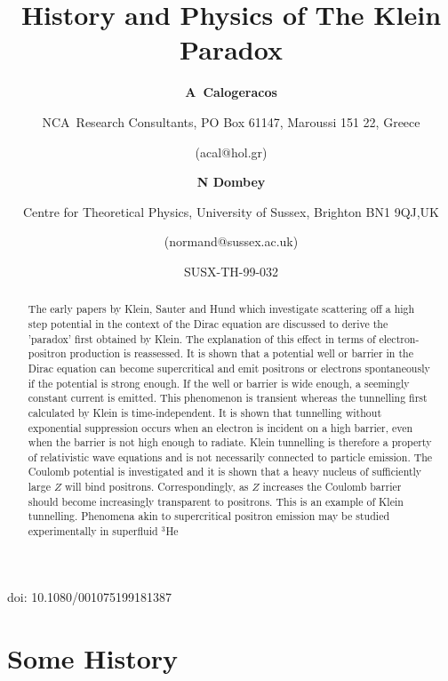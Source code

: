 doi: 10.1080/001075199181387



\title{{\bf History and Physics of The Klein Paradox}}
\author{{\bf A\ Calogeracos}}
\author{NCA\ Research Consultants, PO Box 61147, Maroussi 151 22, Greece}
\author{(acal@hol.gr)}
\author{{\bf N Dombey}}
\author{Centre for Theoretical Physics, University of Sussex, Brighton BN1 9QJ,UK}
\author{(normand@sussex.ac.uk)}
\date{SUSX-TH-99-032}
\maketitle

\begin{abstract}
\newline
\noindent The early papers by Klein, Sauter and Hund which investigate
scattering off a high step potential in the context of the Dirac equation
are discussed to derive the 'paradox' first obtained by Klein. The
explanation of this effect in terms of electron-positron production is
reassessed. It is shown that a potential well or barrier in the Dirac
equation can become supercritical and emit  positrons or electrons 
spontaneously if the potential is strong enough. If the well or barrier 
is wide enough, a seemingly constant current is emitted. This 
phenomenon is transient whereas the tunnelling first calculated 
by Klein is time-independent. It is shown that tunnelling without 
exponential suppression occurs when an electron is incident on a 
high barrier, even when the barrier is not high enough to radiate. 
Klein tunnelling is therefore a property of relativistic wave 
equations and is not necessarily connected to particle emission. The 
Coulomb potential is investigated and it is shown that a heavy nucleus of
sufficiently large $Z$ will bind positrons. Correspondingly, 
as $Z$ increases the Coulomb barrier should become increasingly
transparent to positrons. This is an example of Klein tunnelling. Phenomena 
akin to supercritical positron emission may be studied experimentally 
in superfluid $^3$He
\end{abstract}

\section{Some History}

